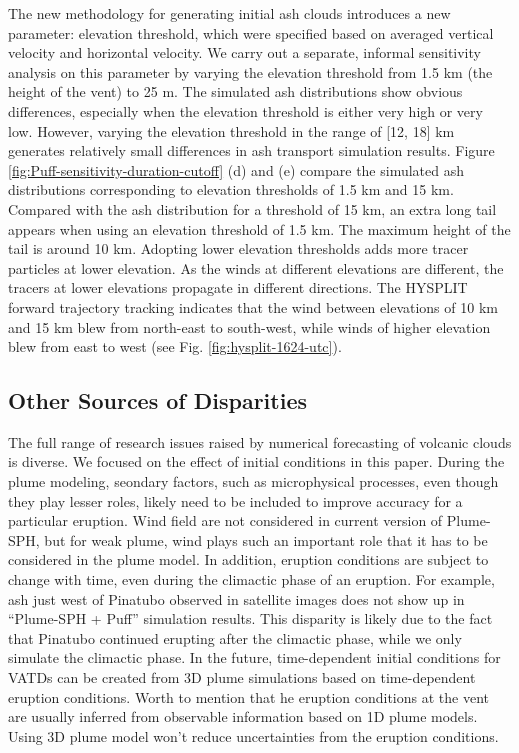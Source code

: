 \documentclass[utf8]{frontiersSCNS} %
\begin{document}
The new methodology for generating initial ash clouds introduces a new parameter: elevation threshold, which were specified based on averaged vertical velocity and horizontal velocity. We carry out a separate, informal sensitivity analysis on this parameter by varying the elevation threshold from 1.5 km (the height of the vent) to 25 m. The simulated ash distributions show obvious differences, especially when the elevation threshold is either very high or very low. However, varying the elevation threshold in the range of [12, 18] km generates relatively small differences in ash transport simulation results.  Figure \ref{fig:Puff-sensitivity-duration-cutoff} (d) and (e) compare the simulated ash distributions corresponding to elevation thresholds of 1.5 km and 15 km. Compared with the ash distribution for a threshold of 15 km, an extra long tail appears when using an elevation threshold of 1.5 km. The maximum height of the tail is around 10 km. Adopting lower elevation thresholds adds more tracer particles at lower elevation. As the winds at different elevations are different, the tracers at lower elevations propagate in different directions. The HYSPLIT forward trajectory tracking indicates that the wind between elevations of 10 km and 15 km blew from north-east to south-west, while winds of higher elevation blew from east to west (see Fig. \ref{fig:hysplit-1624-utc}). %

\subsection{Other Sources of Disparities}
The full range of research issues raised by numerical forecasting of volcanic clouds is diverse. We focused on the effect of initial conditions in this paper. During the plume modeling, seondary factors, such as microphysical processes, even though they play lesser roles, likely need to be included to improve accuracy for a particular eruption. Wind field are not considered in current version of Plume-SPH, but for weak plume, wind plays such an important role that it has to be considered in the plume model. In addition, eruption conditions are subject to change with time, even during the climactic phase of an eruption. For example, ash just west of Pinatubo observed in satellite images does not show up in ``Plume-SPH + Puff'' simulation results. This disparity is likely due to the fact that Pinatubo continued erupting after the climactic phase, while we only simulate the climactic phase. In the future, time-dependent initial conditions for VATDs can be created from 3D plume simulations based on time-dependent eruption conditions. Worth to mention that he eruption conditions at the vent are usually inferred from observable information based on 1D plume models. Using 3D plume model won't reduce uncertainties from the eruption conditions.
\end{document}

